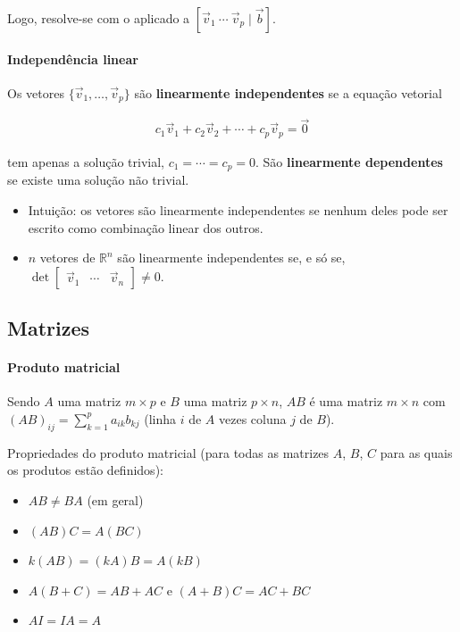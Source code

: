 \documentclass{article}
\begin{document}
Logo, resolve-se com o  aplicado a
$[\vec{v}_1 \ \cdots \ \vec{v}_p \mid \vec{b}]$.

\paragraph{Independência linear}

Os vetores $\{\vec{v}_1, \ldots, \vec{v}_p\}$ são \textbf{linearmente independentes} se a equação vetorial

\begin{gather*}
c_1 \vec{v}_1 + c_2 \vec{v}_2 + \cdots + c_p \vec{v}_p = \vec{0}
\end{gather*}

tem apenas a solução trivial, $c_1 = \cdots = c_p = 0$. São \textbf{linearmente dependentes} se existe uma
solução não trivial.

\begin{itemize}
    \item Intuição: os vetores são linearmente independentes se nenhum deles pode ser escrito como combinação
    linear dos outros.
    \item $n$ vetores de $\mathbb{R}^n$ são linearmente independentes se, e só se,
    $\det \begin{bmatrix} \vec{v}_1 & \cdots & \vec{v}_n \end{bmatrix} \neq 0$.
\end{itemize}

\bigskip

\subsection{Matrizes}

\paragraph{Produto matricial}

Sendo $A$ uma matriz $m \times p$ e $B$ uma matriz $p \times n$, $AB$ é uma matriz $m \times n$ com
$(AB)_{ij} = \sum_{k=1}^{p} a_{ik} b_{kj}$ (linha $i$ de $A$ vezes coluna $j$ de $B$).

\smallskip

Propriedades do produto matricial (para todas as matrizes $A$, $B$, $C$ para as quais os produtos estão
definidos):

\begin{itemize}
    \item $AB \neq BA$ (em geral)
    \item $(AB)C = A(BC)$
    \item $k(AB) = (kA)B = A(kB)$
    \item $A(B + C) = AB + AC$ e $(A + B)C = AC + BC$
    \item $AI = IA = A$
\end{itemize}
\end{document}
